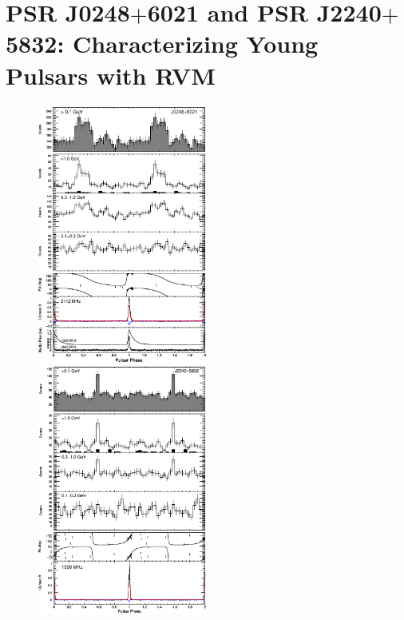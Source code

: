 \section{PSR J0248$+$6021 and PSR J2240$+$5832: Characterizing Young Pulsars with RVM}


\begin{figure}[t!!]
\includegraphics[width=0.5\textwidth]{chapters/multiWaveLength/figures/J0248+6021_catalog_lightcurve.eps}
\includegraphics[width=0.5\textwidth]{chapters/multiWaveLength/figures/J2240+5832_catalog_lightcurve.eps}

\end{figure}
